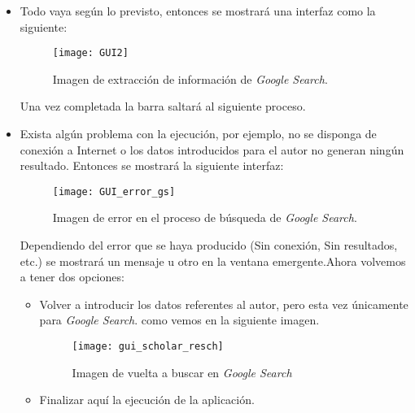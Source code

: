 \begin{itemize}
	\item Todo vaya según lo previsto, entonces se mostrará una interfaz como la siguiente:
	\begin{figure}[H]
	\centering
	\texttt{[image: GUI2]}
	\caption{Imagen de extracción de información de \emph{Google Search}.}
	\end{figure}
	Una vez completada la barra saltará al siguiente proceso.
	\item Exista algún problema con la ejecución, por ejemplo, no se disponga de conexión a Internet o los datos introducidos para el autor no generan ningún resultado. Entonces se mostrará la siguiente interfaz:
		\begin{figure}[H]
	\centering
	\texttt{[image: GUI\_error\_gs]}
	\caption{Imagen de error en el proceso de búsqueda de \emph{Google Search}.}
	\end{figure}
	Dependiendo del error que se haya producido (Sin conexión, Sin resultados, etc.) se mostrará un mensaje u otro en la ventana emergente.Ahora volvemos a tener dos opciones:
	\begin{itemize}
		\item Volver a introducir los datos referentes al autor, pero esta vez únicamente para \emph{Google Search}. como vemos en la siguiente imagen.
		\begin{figure}[H]
	\centering
	\texttt{[image: gui\_scholar\_resch]}
	\caption{Imagen de vuelta a buscar en \emph{Google Search}}
	\end{figure}
		\item Finalizar aquí la ejecución de la aplicación.
	\end{itemize}
\end{itemize}

